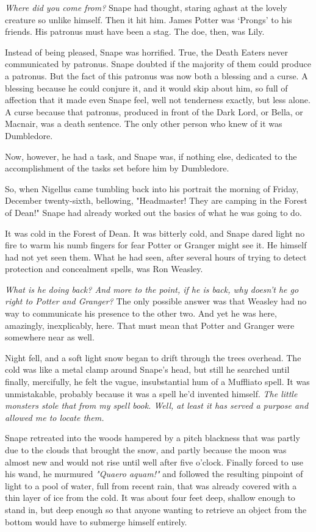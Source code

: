 \emph{Where did you come from?} Snape had thought, staring aghast at the lovely creature so unlike himself. Then it hit him. James Potter was `Prongs' to his friends. His patronus must have been a stag. The doe, then, was Lily.

Instead of being pleased, Snape was horrified. True, the Death Eaters never communicated by patronus. Snape doubted if the majority of them could produce a patronus. But the fact of this patronus was now both a blessing and a curse. A blessing because he could conjure it, and it would skip about him, so full of affection that it made even Snape feel, well not tenderness exactly, but less alone. A curse because that patronus, produced in front of the Dark Lord, or Bella, or Macnair, was a death sentence. The only other person who knew of it was Dumbledore.

Now, however, he had a task, and Snape was, if nothing else, dedicated to the accomplishment of the tasks set before him by Dumbledore.

So, when Nigellus came tumbling back into his portrait the morning of Friday, December twenty-sixth, bellowing, "Headmaster! They are camping in the Forest of Dean!" Snape had already worked out the basics of what he was going to do.

It was cold in the Forest of Dean. It was bitterly cold, and Snape dared light no fire to warm his numb fingers for fear Potter or Granger might see it. He himself had not yet seen them. What he had seen, after several hours of trying to detect protection and concealment spells, was Ron Weasley.

\emph{What is he doing back? And more to the point, if he is back, why doesn't he go right to Potter and Granger?} The only possible answer was that Weasley had no way to communicate his presence to the other two. And yet he was here, amazingly, inexplicably, here. That must mean that Potter and Granger were somewhere near as well.

Night fell, and a soft light snow began to drift through the trees overhead. The cold was like a metal clamp around Snape's head, but still he searched until finally, mercifully, he felt the vague, insubstantial hum of a Muffliato spell. It was unmistakable, probably because it was a spell he'd invented himself. \emph{The little monsters stole that from my spell book. Well, at least it has served a purpose and allowed me to locate them.}

Snape retreated into the woods hampered by a pitch blackness that was partly due to the clouds that brought the snow, and partly because the moon was almost new and would not rise until well after five o'clock. Finally forced to use his wand, he murmured \emph{"Quaero aquam!"} and followed the resulting pinpoint of light to a pool of water, full from recent rain, that was already covered with a thin layer of ice from the cold. It was about four feet deep, shallow enough to stand in, but deep enough so that anyone wanting to retrieve an object from the bottom would have to submerge himself entirely.

